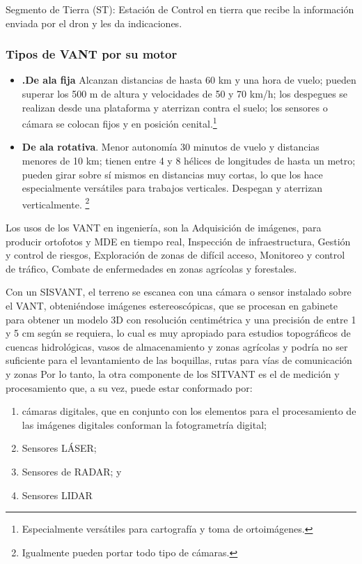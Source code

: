 Segmento de Tierra (ST): Estación de Control en tierra que recibe la información enviada por el dron y les da indicaciones.

\subsubsection{Tipos de VANT por su motor}

\begin{itemize}
    \item \textbf{.De ala fija} Alcanzan distancias de hasta 60 km y una hora de vuelo; pueden superar los 500 m de altura y velocidades de 50 y 70 km/h; los despegues se realizan desde una plataforma y aterrizan contra el suelo; los sensores o cámara se colocan fijos y en posición cenital.\footnote{Especialmente versátiles para cartografía y toma de ortoimágenes.}
    \item \textbf{De ala rotativa}. Menor autonomía 30 minutos de vuelo y distancias menores de 10 km; tienen entre 4 y 8 hélices de longitudes de hasta un metro; pueden girar sobre sí mismos en distancias muy cortas, lo que los hace especialmente versátiles para trabajos verticales. Despegan y aterrizan verticalmente. \footnote{Igualmente pueden portar todo tipo de cámaras.}
\end{itemize}

Los usos de los VANT en ingeniería, son la Adquisición de imágenes, para producir ortofotos y MDE en tiempo real,
Inspección de infraestructura, Gestión y control de riesgos, Exploración de zonas de difícil acceso,
Monitoreo y control de tráfico, Combate de enfermedades en zonas agrícolas y forestales.

Con un SISVANT, el terreno se escanea con una cámara o sensor instalado sobre el
VANT, obteniéndose imágenes estereoscópicas, que se procesan en gabinete para obtener un modelo 3D con resolución centimétrica y una precisión de entre 1 y 5 cm según se requiera, lo cual es muy apropiado para estudios topográficos de cuencas hidrológicas, vasos de almacenamiento y zonas agrícolas y podría no ser suficiente para el levantamiento de las boquillas, rutas para vías de comunicación y zonas
Por lo tanto, la otra componente de los SITVANT es el de medición y procesamiento que, a su vez, puede estar conformado por:

\begin{enumerate}
    \item cámaras digitales, que en conjunto con los elementos para el procesamiento de las imágenes digitales conforman la fotogrametría digital;
    \item Sensores LÁSER;
    \item Sensores de RADAR; y
    \item Sensores LIDAR
\end{enumerate}

